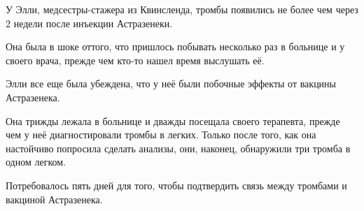 У Элли, медсестры-стажера из Квинсленда, тромбы появились не более чем через 2
недели после инъекции Астразенеки.

Она была в шоке оттого, что пришлось побывать несколько раз в больнице и у
своего врача, прежде чем кто-то нашел время выслушать её.

Элли все еще была убеждена, что у неё были побочные эффекты от вакцины
Астразенека.

Она трижды лежала в больнице и дважды посещала своего терапевта, прежде чем у
неё диагностировали тромбы в легких. Только после того, как она настойчиво
попросила сделать анализы, они, наконец, обнаружили три тромба в одном легком.

Потребовалось пять дней для того, чтобы подтвердить связь между тромбами и
вакциной Астразенека.
